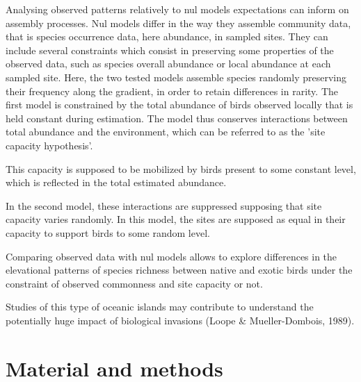 \documentclass{article}
\begin{document}
Analysing observed patterns relatively to nul models expectations can inform on assembly processes. Nul models differ in the way they assemble community data, that is species occurrence data, here abundance, in sampled sites. They can include several constraints which consist in preserving some properties of the observed data, such as species overall abundance or local abundance at each sampled site. Here, the two tested models assemble species randomly preserving their frequency along the gradient, in order to retain differences in rarity. The first model is constrained by the total abundance of birds observed locally that is held constant during estimation. The model thus conserves interactions between total abundance and the environment, which can be referred to as the 'site capacity hypothesis'. 


This capacity is supposed to be mobilized by birds present to some constant level, which is reflected in the total estimated abundance. 

In the second model, these interactions are suppressed supposing that site capacity varies randomly. In this model, the sites are supposed as equal in their capacity to support birds to some random level. 

Comparing observed data with nul models allows to explore differences in the elevational patterns of species richness between native and exotic birds under the constraint of observed commonness and site capacity or not. 



Studies of this type of oceanic islands may contribute to understand the potentially huge impact of biological invasions (Loope \& Mueller-Dombois, 1989). 




\section{Material and methods}
\end{document}

